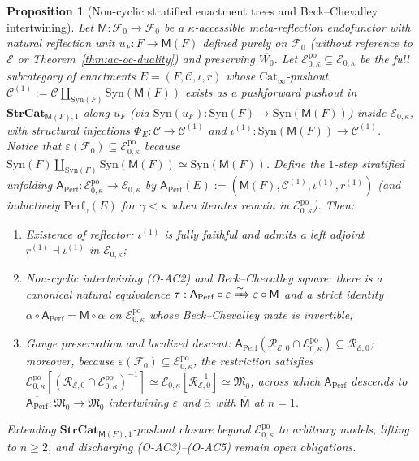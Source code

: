 \documentclass[11pt]{article}
\theoremstyle{plain}
\newtheorem{proposition}[theorem]{Proposition}
\theoremstyle{definition}
\newcommand{\cF}{\mathcal{F}}
\newcommand{\cC}{\mathcal{C}}
\newcommand{\fM}{\mathfrak{M}}
\newcommand{\Cat}{\mathrm{Cat}}
\newcommand{\Syn}{\mathrm{Syn}}
\newcommand{\cE}{\mathcal{E}}
\begin{document}
\begin{proposition}[Non-cyclic stratified enactment trees and Beck--Chevalley intertwining]\label{prop:perf-noncyclic-bc}
Let $\mathsf{M} : \cF_0 \to \cF_0$ be a $\kappa$-accessible meta-reflection endofunctor with natural reflection unit $u_F : F \to \mathsf{M}(F)$ defined purely on $\cF_0$ (without reference to $\cE$ or Theorem~\ref{thm:ac-oc-duality}) and preserving $\overline{W_0}$. Let $\cE_{0,\kappa}^{\mathrm{po}} \subseteq \cE_{0,\kappa}$ be the full subcategory of enactments $E = (F, \cC, \iota, r)$ whose $\Cat_\infty$-pushout $\cC^{(1)} := \cC \amalg_{\Syn(F)} \Syn(\mathsf{M}(F))$ exists as a pushforward pushout in $\mathbf{StrCat}_{\mathsf{M}(F), 1}$ along $u_F$ (via $\Syn(u_F) : \Syn(F) \to \Syn(\mathsf{M}(F))$) inside $\cE_{0, \kappa}$, with structural injections $\Phi_E : \cC \to \cC^{(1)}$ and $\iota^{(1)} : \Syn(\mathsf{M}(F)) \to \cC^{(1)}$. Notice that $\varepsilon(\cF_0) \subseteq \cE_{0,\kappa}^{\mathrm{po}}$ because $\Syn(F) \amalg_{\Syn(F)} \Syn(\mathsf{M}(F)) \simeq \Syn(\mathsf{M}(F))$. Define the $1$-step stratified unfolding $\mathsf{A}_{\mathrm{Perf}} : \cE_{0,\kappa}^{\mathrm{po}} \to \cE_{0,\kappa}$ by $\mathsf{A}_{\mathrm{Perf}}(E) := (\mathsf{M}(F), \cC^{(1)}, \iota^{(1)}, r^{(1)})$ (and inductively $\mathrm{Perf}_\gamma(E)$ for $\gamma < \kappa$ when iterates remain in $\cE_{0,\kappa}^{\mathrm{po}}$). Then:
\begin{enumerate}[nosep,label=(\roman*)]
\item \emph{Existence of reflector}: $\iota^{(1)}$ is fully faithful and admits a left adjoint $r^{(1)} \dashv \iota^{(1)}$ in $\cE_{0,\kappa}$;
\item \emph{Non-cyclic intertwining \textup{(O-AC2)} and Beck--Chevalley square}: there is a canonical natural equivalence $\tau : \mathsf{A}_{\mathrm{Perf}} \circ \varepsilon \xRightarrow{\simeq} \varepsilon \circ \mathsf{M}$ and a strict identity $\alpha \circ \mathsf{A}_{\mathrm{Perf}} = \mathsf{M} \circ \alpha$ on $\cE_{0,\kappa}^{\mathrm{po}}$ whose Beck--Chevalley mate is invertible;
\item \emph{Gauge preservation and localized descent}: $\mathsf{A}_{\mathrm{Perf}}(\mathcal{R}_{\cE, 0} \cap \cE_{0,\kappa}^{\mathrm{po}}) \subseteq \mathcal{R}_{\cE, 0}$; moreover, because $\varepsilon(\cF_0) \subseteq \cE_{0,\kappa}^{\mathrm{po}}$, the restriction satisfies $\cE_{0,\kappa}^{\mathrm{po}}[(\mathcal{R}_{\cE,0} \cap \cE_{0,\kappa}^{\mathrm{po}})^{-1}] \simeq \cE_{0,\kappa}[\mathcal{R}_{\cE,0}^{-1}] \simeq \fM_0$, across which $\mathsf{A}_{\mathrm{Perf}}$ descends to $\overline{\mathsf{A}_{\mathrm{Perf}}} : \fM_0 \to \fM_0$ intertwining $\overline{\varepsilon}$ and $\overline{\alpha}$ with $\overline{\mathsf{M}}$ at $n = 1$.
\end{enumerate}
Extending $\mathbf{StrCat}_{\mathsf{M}(F), 1}$-pushout closure beyond $\cE_{0,\kappa}^{\mathrm{po}}$ to arbitrary models, lifting to $n \ge 2$, and discharging \textup{(O-AC3)--(O-AC5)} remain open obligations.
\end{proposition}
\end{document}
